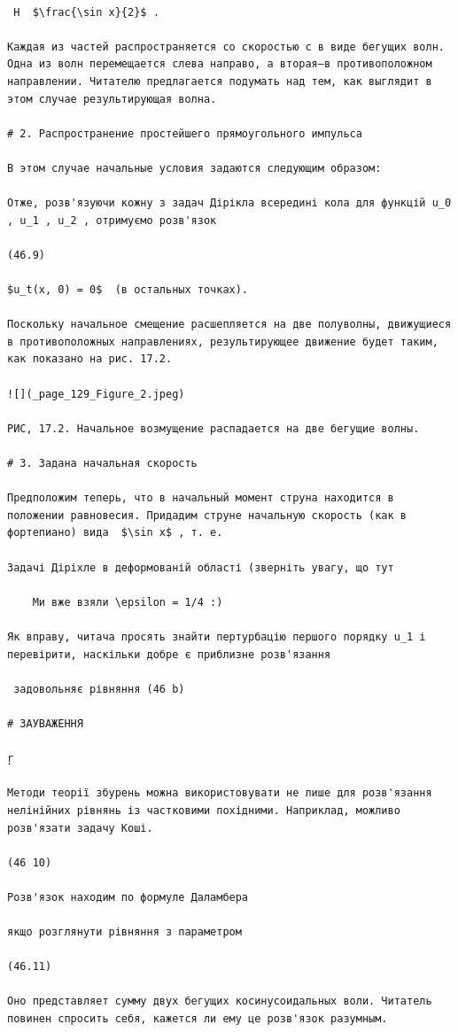 \documentclass[
  ukrainian,
]{article}
\begin{document}
\begin{verbatim}

 H  $\frac{\sin x}{2}$ .

Каждая из частей распространяется со скоростью с в виде бегущих волн. Одна из волн перемещается слева направо, а вторая—в противоположном направлении. Читателю предлагается подумать над тем, как выглядит в этом случае результирующая волна.

# 2. Распространение простейшего прямоугольного импульса

В этом случае начальные условия задаются следующим образом:

Отже, розв'язуючи кожну з задач Дірікла всередині кола для функцій u_0 , u_1 , u_2 , отримуємо розв'язок

(46.9)

$u_t(x, 0) = 0$  (в остальных точках).

Поскольку начальное смещение расшепляется на две полуволны, движущиеся в противоположных направлениях, результирующее движение будет таким, как показано на рис. 17.2.

![](_page_129_Figure_2.jpeg)

РИС, 17.2. Начальное возмущение распадается на две бегущие волны.

# 3. Задана начальная скорость

Предположим теперь, что в начальный момент струна находится в положении равновесия. Придадим струне начальную скорость (как в фортепиано) вида  $\sin x$ , т. е.

Задачі Діріхле в деформованій області (зверніть увагу, що тут

    Ми вже взяли \epsilon = 1/4 :)

Як вправу, читача просять знайти пертурбацію першого порядку u_1 і перевірити, наскільки добре є приблизне розв'язання

 задовольняє рівняння (46 b)

# ЗАУВАЖЕННЯ

ŗ

Методи теорії збурень можна використовувати не лише для розв'язання нелінійних рівнянь із частковими похідними. Наприклад, можливо розв'язати задачу Коші.

(46 10)

Розв'язок находим по формуле Даламбера

якщо розглянути рівняння з параметром

(46.11)

Оно представляет сумму двух бегущих косинусоидальных воли. Читатель повинен спросить себя, кажется ли ему це розв'язок разумным.


\end{verbatim}
\end{document}
